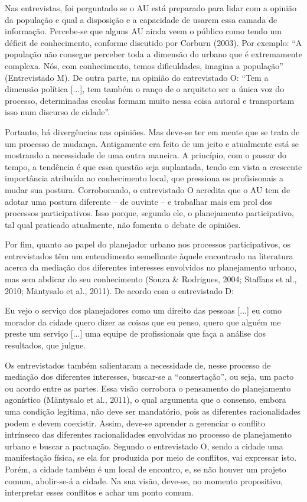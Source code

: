 \documentclass{article}
\begin{document}
\begin{multicols}{2}
Nas entrevistas, foi perguntado se o AU está preparado para lidar com a opinião
da população e qual a disposição e a capacidade de usarem essa camada de
informação. Percebe-se que alguns AU ainda veem o público como tendo um déficit
de conhecimento, conforme discutido por Corburn
(2003). Por exemplo: “A população não consegue perceber toda
a dimensão do urbano que é extremamente complexa. Nós, com conhecimento,
temos dificuldades, imagina a população” (Entrevistado M). De outra
parte, na opinião do entrevistado O: “Tem a dimensão política
[...], tem também o ranço de o arquiteto ser a única voz do processo,
determinadas escolas formam muito nessa coisa autoral e transportam isso num
discurso de cidade”.

Portanto, há divergências nas opiniões. Mas deve-se ter em mente que se trata de
um processo de mudança. Antigamente era feito de um jeito e atualmente está se
mostrando a necessidade de uma outra maneira. A princípio, com o passar do
tempo, a tendência é que essa questão seja suplantada, tendo em vista a
crescente importância atribuída ao conhecimento local, que pressiona os
profisisonais a mudar sua postura. Corroborando, o entrevistado O acredita que o
AU tem de adotar uma postura diferente – de ouvinte – e trabalhar mais em prol
dos processos participativos. Isso porque, segundo ele, o planejamento
participativo, tal qual praticado atualmente, não fomenta o debate de
opiniões.

Por fim, quanto ao papel do planejador urbano nos processos participativos, os
entrevistados têm um entendimento semelhante àquele encontrado na literatura
acerca da mediação dos diferentes interesses envolvidos no planejamento urbano,
mas sem abdicar do seu conhecimento (Souza
\& Rodrigues, 2004; Staffans et
al., 2010; Mäntysalo et al.,
2011). De acordo com o entrevistado D:

Eu vejo o serviço dos planejadores como um direito das pessoas
[...] eu como morador da cidade quero dizer as coisas
que eu penso, quero que alguém me preste um serviço [...]
uma equipe de profissionais que faça a análise dos resultados, que
julgue.

Os entrevistados também salientaram a necessidade de, nesse processo de mediação
dos diferentes interesses, buscar-se a “consertação”, ou seja, um pacto ou
acordo entre as partes. Essa visão corrobora o pensamento do planejamento
agonístico (Mäntysalo et al., 2011), o
qual argumenta que o consenso, embora uma condição legítima, não deve ser
mandatório, pois as diferentes racionalidades podem e devem coexistir. Assim,
deve-se aprender a gerenciar o conflito intrínseco das diferentes racionalidades
envolvidas no processo de planejamento urbano e buscar a pactuação. Segundo o
entrevistado O, sendo a cidade uma manifestação física, se ela for produzida por
meio de conflitos, vai expressar isto. Porém, a cidade também é um local de
encontro, e, se não houver um projeto comum, abolir-se-á a cidade. Na sua visão,
deve-se, no momento propositivo, interpretar esses conflitos e achar um ponto
comum.


\end{multicols}
\end{document}
